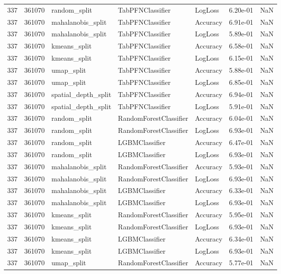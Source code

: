 \begin{tabular}{rrlllrr}
337 & 361070 & random\_split & TabPFNClassifier & LogLoss & 6.20e-01 & NaN \\
337 & 361070 & mahalanobis\_split & TabPFNClassifier & Accuracy & 6.91e-01 & NaN \\
337 & 361070 & mahalanobis\_split & TabPFNClassifier & LogLoss & 5.89e-01 & NaN \\
337 & 361070 & kmeans\_split & TabPFNClassifier & Accuracy & 6.58e-01 & NaN \\
337 & 361070 & kmeans\_split & TabPFNClassifier & LogLoss & 6.15e-01 & NaN \\
337 & 361070 & umap\_split & TabPFNClassifier & Accuracy & 5.88e-01 & NaN \\
337 & 361070 & umap\_split & TabPFNClassifier & LogLoss & 6.85e-01 & NaN \\
337 & 361070 & spatial\_depth\_split & TabPFNClassifier & Accuracy & 6.94e-01 & NaN \\
337 & 361070 & spatial\_depth\_split & TabPFNClassifier & LogLoss & 5.91e-01 & NaN \\
337 & 361070 & random\_split & RandomForestClassifier & Accuracy & 6.04e-01 & NaN \\
337 & 361070 & random\_split & RandomForestClassifier & LogLoss & 6.93e-01 & NaN \\
337 & 361070 & random\_split & LGBMClassifier & Accuracy & 6.47e-01 & NaN \\
337 & 361070 & random\_split & LGBMClassifier & LogLoss & 6.93e-01 & NaN \\
337 & 361070 & mahalanobis\_split & RandomForestClassifier & Accuracy & 5.93e-01 & NaN \\
337 & 361070 & mahalanobis\_split & RandomForestClassifier & LogLoss & 6.93e-01 & NaN \\
337 & 361070 & mahalanobis\_split & LGBMClassifier & Accuracy & 6.33e-01 & NaN \\
337 & 361070 & mahalanobis\_split & LGBMClassifier & LogLoss & 6.93e-01 & NaN \\
337 & 361070 & kmeans\_split & RandomForestClassifier & Accuracy & 5.95e-01 & NaN \\
337 & 361070 & kmeans\_split & RandomForestClassifier & LogLoss & 6.93e-01 & NaN \\
337 & 361070 & kmeans\_split & LGBMClassifier & Accuracy & 6.34e-01 & NaN \\
337 & 361070 & kmeans\_split & LGBMClassifier & LogLoss & 6.93e-01 & NaN \\
337 & 361070 & umap\_split & RandomForestClassifier & Accuracy & 5.77e-01 & NaN \\

\end{tabular}
